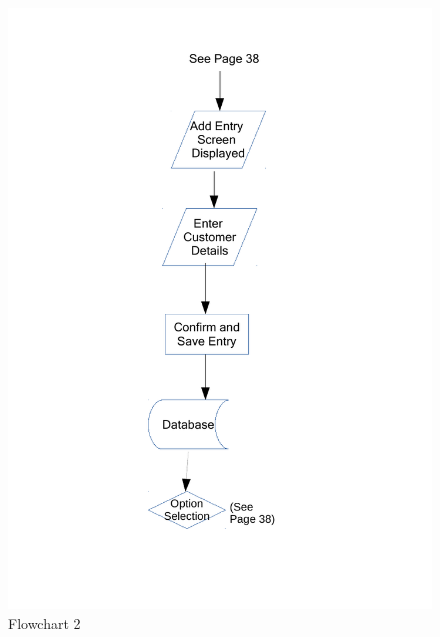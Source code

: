 \begin{figure}[H]
    \caption{Flowchart 2} \label{Flowchart_2.pdf}
    \includegraphics[width=\textwidth]{./Design/Flowcharts/Flowchart_2.pdf}
\end{figure}

